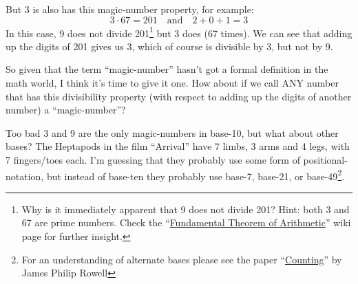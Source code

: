 \documentclass{article}
\begin{document}
But 3 is also has this magic-number property, for example:
\[ 3\cdot{}67=201 \quad\text{and}\quad 2+0+1=3\]
In this case, 9 does not divide 201\footnote{Why is it immediately
apparent that 9 does not divide 201? Hint: both 3 and 67 are prime numbers.
Check the ``\href{https://en.wikipedia.org/wiki/Fundamental_theorem_of_arithmetic}{Fundamental
Theorem of Arithmetic}'' wiki page for further insight.}
but 3 does (67 times).
We can see that adding up the digits of 201 gives us 3,
which of course is divisible by 3, but not by 9.

So given that the term ``magic-number'' hasn't got
a formal definition in the math world, I think it's time to give it one.
How about if we call ANY number that has this
divisibility property (with respect to adding up the digits of another number) a ``magic-number''?

Too bad 3 and 9 are the only magic-numbers in base-10,
but what about other bases?
The Heptapods in the film ``Arrival'' have 7 limbs, 3 arms and 4 legs, with 7 fingers/toes each.
I'm guessing that they probably use some form of positional-notation,
but instead of base-ten they probably use base-7, base-21,
or base-49\footnote{For an understanding of alternate bases please see
the paper ``\href {https://www.dropbox.com/s/bwmrffmkcidnf27/basisReprThm.pdf?dl=0}
{Counting}'' by James Philip Rowell}.
\end{document}
